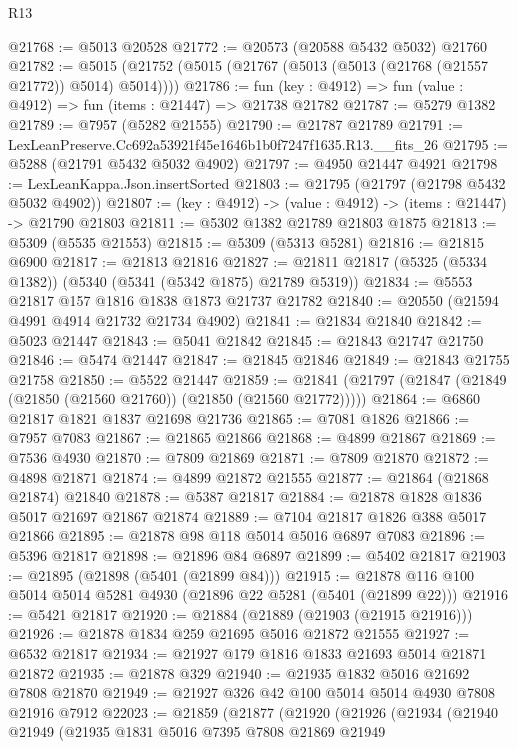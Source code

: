 \begin{lexlean}{R13}
\begin{coremodule}
@21768 := @5013 @20528
@21772 := @20573 (@20588 @5432 @5032) @21760
@21782 := @5015 (@21752 (@5015 (@21767 (@5013 (@5013 (@21768 (@21557 @21772)) @5014) @5014))))
@21786 := fun (key : @4912) => fun (value : @4912) => fun (items : @21447) => @21738 @21782
@21787 := @5279 @1382
@21789 := @7957 (@5282 @21555)
@21790 := @21787 @21789
@21791 := LexLeanPreserve.Cc692a53921f45e1646b1b0f7247f1635.R13.__fits_26
@21795 := @5288 (@21791 @5432 @5032 @4902)
@21797 := @4950 @21447 @4921
@21798 := LexLeanKappa.Json.insertSorted
@21803 := @21795 (@21797 (@21798 @5432 @5032 @4902))
@21807 := (key : @4912) -> (value : @4912) -> (items : @21447) -> @21790 @21803
@21811 := @5302 @1382 @21789 @21803 @1875
@21813 := @5309 (@5535 @21553)
@21815 := @5309 (@5313 @5281)
@21816 := @21815 @6900
@21817 := @21813 @21816
@21827 := @21811 @21817 (@5325 (@5334 @1382)) (@5340 (@5341 (@5342 @1875) @21789 @5319))
@21834 := @5553 @21817 @157 @1816 @1838 @1873 @21737 @21782
@21840 := @20550 (@21594 @4991 @4914 @21732 @21734 @4902)
@21841 := @21834 @21840
@21842 := @5023 @21447
@21843 := @5041 @21842
@21845 := @21843 @21747 @21750
@21846 := @5474 @21447
@21847 := @21845 @21846
@21849 := @21843 @21755 @21758
@21850 := @5522 @21447
@21859 := @21841 (@21797 (@21847 (@21849 (@21850 (@21560 @21760)) (@21850 (@21560 @21772)))))
@21864 := @6860 @21817 @1821 @1837 @21698 @21736
@21865 := @7081 @1826
@21866 := @7957 @7083
@21867 := @21865 @21866
@21868 := @4899 @21867
@21869 := @7536 @4930
@21870 := @7809 @21869
@21871 := @7809 @21870
@21872 := @4898 @21871
@21874 := @4899 @21872 @21555
@21877 := @21864 (@21868 @21874) @21840
@21878 := @5387 @21817
@21884 := @21878 @1828 @1836 @5017 @21697 @21867 @21874
@21889 := @7104 @21817 @1826 @388 @5017 @21866
@21895 := @21878 @98 @118 @5014 @5016 @6897 @7083
@21896 := @5396 @21817
@21898 := @21896 @84 @6897
@21899 := @5402 @21817
@21903 := @21895 (@21898 (@5401 (@21899 @84)))
@21915 := @21878 @116 @100 @5014 @5014 @5281 @4930 (@21896 @22 @5281 (@5401 (@21899 @22)))
@21916 := @5421 @21817
@21920 := @21884 (@21889 (@21903 (@21915 @21916)))
@21926 := @21878 @1834 @259 @21695 @5016 @21872 @21555
@21927 := @6532 @21817
@21934 := @21927 @179 @1816 @1833 @21693 @5014 @21871 @21872
@21935 := @21878 @329
@21940 := @21935 @1832 @5016 @21692 @7808 @21870
@21949 := @21927 @326 @42 @100 @5014 @5014 @4930 @7808 @21916 @7912
@22023 := @21859
    (@21877
      (@21920
        (@21926
          (@21934
            (@21940
              @21949
              (@21935
                @1831
                @5016
                @7395
                @7808
                @21869
                @21949

\end{coremodule}
\end{lexlean}
